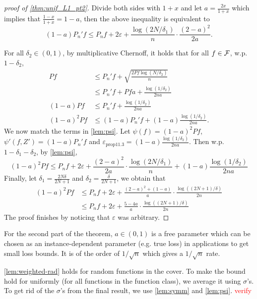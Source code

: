 \documentclass[twoside]{article}
\begin{document}
\begin{proof}[proof of \cref{thm:unif_L1_pt2}]
    Divide both sides with $1+x$ and let $a=\frac{2x}{1+x}$ which implies that $\frac{1-x}{1+x}=1-a$, then the above inequality is equivalent to
    \begin{equation*}
        (1-a)P_n'f\le P_nf +2\varepsilon+\frac{\log(2N/\delta_1)}{n}\cdot \frac{(2-a)^2}{2a}.
    \end{equation*}
    
    For all $\delta_2\in (0,1)$, by multiplicative Chernoff, it holds that for all $f\in \mathcal{F}$, w.p. $1-\delta_2$, 
    \begin{align*}
        Pf&\le P_n'f +\sqrt{\frac{2Pf\log(N/\delta_2)}{n}}\\
        &\le P_n'f + Pfa + \frac{\log(1/\delta_2)}{2na}\\
        (1-a)Pf&\le P_n'f + \frac{\log(1/\delta_2)}{2na}\\
        (1-a)^2Pf&\le (1-a)P_n'f + (1-a)\frac{\log(1/\delta_2)}{2na}.
    \end{align*}
    We now match the terms in \cref{lem:psi}. Let $\psi(f)=(1-a)^2Pf$, $\psi'(f,Z')=(1-a)P_n'f$ and $\varepsilon_{\mathrm{prop}11.3}=(1-a)\frac{\log(1/\delta_2)}{2na}$. Then w.p. $1-\delta_1-\delta_2$, by \cref{lem:psi},
    \begin{equation*}
        (1-a)^2Pf\le P_nf + 2\varepsilon+\frac{(2-a)^2}{2a}\cdot \frac{\log(2N/\delta_1)}{n}+(1-a)\frac{\log(1/\delta_2)}{2na}
    \end{equation*}
    Finally, let $\delta_1=\frac{2N\delta}{2N+1}$ and $\delta_2=\frac{\delta}{2N+1}$, we obtain that
    \begin{align*}
        (1-a)^2Pf&\le P_nf +2\varepsilon+\frac{(2-a)^2+(1-a)}{a}\cdot \frac{\log((2N+1)/\delta)}{2n}\\
        &\le P_nf +2\varepsilon+\frac{5-4a}{a}\cdot \frac{\log((2N+1)/\delta)}{2n}
    \end{align*}
    The proof finishes by noticing that $\varepsilon$ was arbitrary.
\end{proof}
For the second part of the theorem, $a \in (0,1)$ is a free parameter which can be chosen as an instance-dependent parameter (e.g. true loss) in applications to get small loss bounds. It is of the order of $1/\sqrt{n}$ which gives a $1/\sqrt{n}$ rate.  

\begin{remark}
    \cref{lem:weighted-rad} holds for random functions in the cover. To make the bound hold for uniformly (for all functions in the function class), we average it using $\sigma$'s. To get rid of the $\sigma$'s from the final result, we use \cref{lem:symm} and \cref{lem:psi}. \textcolor{red}{verify}
\end{remark}
 
\end{document}

